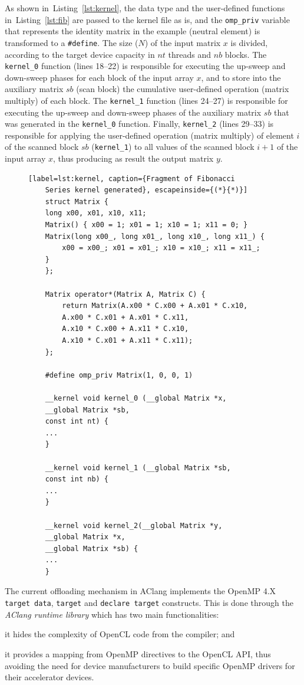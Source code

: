 \documentclass[Ingles]{ic-tese-v1}
\newcommand{\ttt}[1]{{\texttt{#1}}}
\newcommand{\rlst}[1]{Listing~\ref{lst:#1}}
\begin{document}
As  shown in~\rlst{kernel},  the  data  type  and  the
user-defined functions  in~\rlst{fib} are passed to  the kernel file
as is, and the \ttt{omp\_priv} variable that represents the identity
matrix  in  the   example  (neutral  element)  is   transformed  to  a
\ttt{\#define}.  The size ($N$) of  the input matrix $x$ is divided,
according to the target device  capacity in $nt$ threads and $nb$
blocks.  The \ttt{kernel\_0} function  (lines 18--22) is responsible
for executing the  up-sweep and down-sweep phases for  each block of
the input array $x$, and to store into the auxiliary matrix $sb$ (scan
block) the  cumulative user-defined  operation (matrix  multiply) of
each  block.    The  \ttt{kernel\_1}  function  (lines   24--27)  is
responsible for executing the up-sweep  and down-sweep phases of the
auxiliary matrix  $sb$  that was generated  in  the  \ttt{kernel\_0}
function.   Finally, \ttt{kernel\_2}  (lines 29--33)  is responsible
for applying the user-defined operation (matrix multiply) of element
$i$ of  the scanned block  $sb$ (\ttt{kernel\_1}) to  all values  of the
scanned block $i+1$  of the input array $x$, thus  producing  as result the
output matrix $y$.


\begin{figure}[t]
	\lstset{basicstyle=\scriptsize}
	\begin{lstlisting}[label=lst:kernel, caption={Fragment of Fibonacci
	Series kernel generated}, escapeinside={(*}{*)}]
	struct Matrix {
	long x00, x01, x10, x11;
	Matrix() { x00 = 1; x01 = 1; x10 = 1; x11 = 0; }
	Matrix(long x00_, long x01_, long x10_, long x11_) {
		x00 = x00_; x01 = x01_; x10 = x10_; x11 = x11_;
	}
	};

	Matrix operator*(Matrix A, Matrix C) {
		return Matrix(A.x00 * C.x00 + A.x01 * C.x10,
		A.x00 * C.x01 + A.x01 * C.x11,
		A.x10 * C.x00 + A.x11 * C.x10,
		A.x10 * C.x01 + A.x11 * C.x11);
	};

	#define omp_priv Matrix(1, 0, 0, 1)

	__kernel void kernel_0 (__global Matrix *x,
	__global Matrix *sb,
	const int nt) {
	...
	}

	__kernel void kernel_1 (__global Matrix *sb,
	const int nb) {
	...
	}

	__kernel void kernel_2(__global Matrix *y,
	__global Matrix *x,
	__global Matrix *sb) {
	...
	}
	\end{lstlisting}
\end{figure}

The current offloading  mechanism in AClang implements  the OpenMP 4.X
\ttt{target data},  \ttt{target} and \ttt{declare  target} constructs. This is
done through the \textit{AClang runtime library} which  has two main functionalities:
\begin{inparaenum}[(i)\upshape]
	\item it hides the complexity of OpenCL code from the compiler; and
	\item it provides a mapping from  OpenMP directives to the OpenCL API,
	thus avoiding  the need for  device manufacturers to  build specific
	OpenMP drivers for their accelerator devices.
\end{inparaenum}
\end{document}

